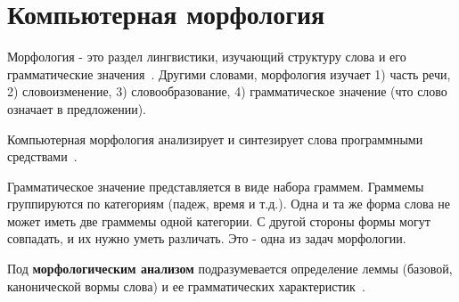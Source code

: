 \section{Компьютерная морфология} \label{sect_review_comp_morphology}

Морфология - это раздел лингвистики, изучающий структуру слова и его грамматические значения~\cite{MitreninaNikolaevLando2016}. Другими словами, морфология изучает
1) часть речи,
2) словоизменение,
3) словообразование,
4) грамматическое значение (что слово означает в предложении). 

Компьютерная морфология анализирует и синтезирует слова программными средствами~\cite{MitreninaNikolaevLando2016}. 

Грамматическое значение представляется в виде набора граммем. Граммемы группируются по категориям (падеж, время и т.д.). Одна и та же форма слова не может иметь две граммемы одной категории. С другой стороны формы могут совпадать, и их нужно уметь различать. Это - одна из задач морфологии.


Под \textbf{морфологическим анализом} подразумевается определение леммы (базовой, канонической вормы слова) и ее грамматических характеристик~\cite{MitreninaNikolaevLando2016}.